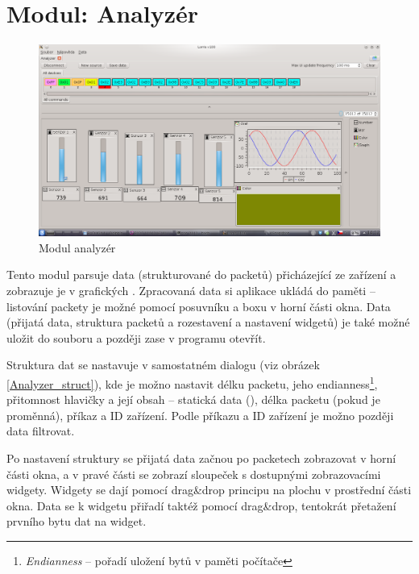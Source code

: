 \documentclass[12pt, a4paper, oneside]{article}
\newcommand{\It}{\textit}  %
\begin{document}
\newpage
\section{Modul: Analyzér}

\begin{figure}[h]
\begin{center}
\includegraphics[width=\textwidth]{img/analyzer_all.png}
\caption{Modul analyzér}
\label{Analyzer}
\end{center}
\end{figure}

Tento modul parsuje data (strukturované do packetů) přicházející ze zařízení a zobrazuje je v grafických . Zpracovaná data si aplikace ukládá do paměti -- listování packety je možné pomocí posuvníku a boxu v horní části okna. Data (přijatá data, struktura packetů a rozestavení a nastavení widgetů) je také možné uložit do souboru a později zase v programu otevřít.  

Struktura dat se nastavuje v samostatném dialogu (viz obrázek \ref{Analyzer_struct}), kde je možno nastavit délku packetu, jeho endianness\footnote{\It{Endianness} -- pořadí uložení bytů v paměti počítače}, přitomnost hlavičky a její obsah -- statická data (), délka packetu (pokud je proměnná), příkaz a ID zařízení. Podle příkazu a ID zařízení je možno později data filtrovat.


\newpage
\setlength{\voffset}{0mm} %
\pagestyle{plain}

Po nastavení struktury se přijatá data začnou po packetech zobrazovat v horní části okna, a v pravé části se zobrazí sloupeček s dostupnými zobrazovacími widgety. Widgety se dají pomocí drag\&drop principu  na plochu v prostřední části okna. Data se k widgetu přiřadí taktéž pomocí drag\&drop, tentokrát přetažení prvního bytu dat na widget. 
\end{document}
